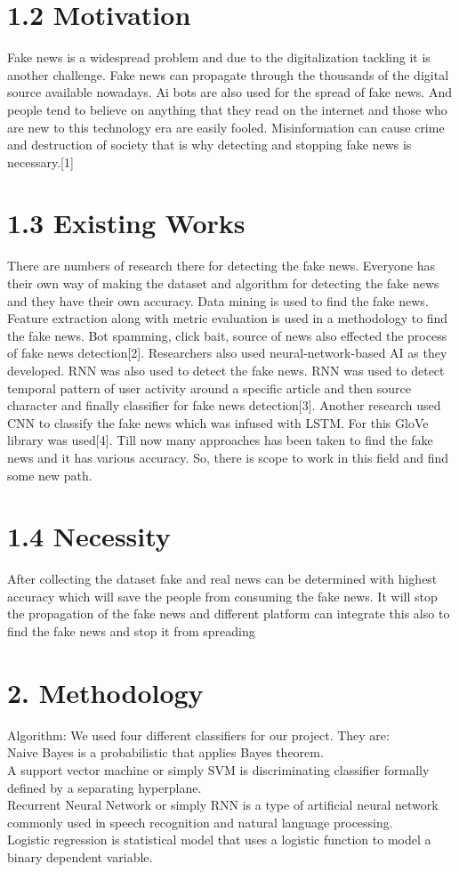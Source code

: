 \documentclass[12pt]{article}
\begin{document}
\section*{1.2 Motivation}
Fake news is a widespread problem and due to the digitalization tackling it is another challenge. Fake news can propagate through the thousands of the digital source available nowadays. Ai bots are also used for the spread of fake news. And people tend to believe on anything that they read on the internet and those who are new to this technology era are easily fooled. Misinformation can cause crime and destruction of society that is why detecting and stopping fake news is necessary.[1]
\section*{1.3 Existing Works}

There are numbers of research there for detecting the fake news. Everyone has their own way of making the dataset and algorithm for detecting the fake news and they have their own accuracy. Data mining is used to find the fake news. Feature extraction along with metric evaluation is used in a methodology to find the fake news. Bot spamming, click bait, source of news also effected the process of fake news detection[2]. Researchers also used neural-network-based AI as they developed. RNN was also used to detect the fake news. RNN was used to detect temporal pattern of user activity around a specific article and then source character and finally classifier for fake news detection[3]. Another research used CNN to classify the fake news which was infused with LSTM. For this GloVe library was used[4]. Till now many approaches has been taken to find the fake news and it has various accuracy. So, there is scope to work in this field and find some new path.
\section*{1.4 Necessity}
After collecting the dataset fake and real news can be determined with highest accuracy which will save the people from consuming the fake news. It will stop the propagation of the fake news and different platform can integrate this also to find the fake news and stop it from spreading

\section*{2. Methodology}
Algorithm:
We used four different classifiers for our project.
They are:\\
Naive Bayes is a probabilistic that applies Bayes theorem.\\
A support vector machine or simply SVM is discriminating classifier formally defined by a separating hyperplane.\\
Recurrent Neural Network or simply RNN is a type of artificial neural network commonly used in speech recognition and natural language processing.\\
Logistic regression is statistical model that uses a logistic function to model a binary dependent variable.\\
\end{document}
